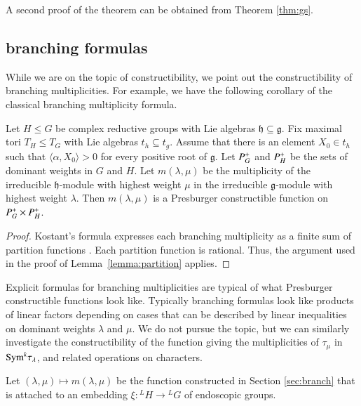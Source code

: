 A second proof of the theorem can be obtained from Theorem \ref{thm:gs}.

\subsection{branching formulas}

While we are on the topic of constructibility, we point out the
constructibility of branching multiplicities.  For example, we have
the following corollary of the classical branching multiplicity formula.


\begin{lemma} 
  Let $H\le G$ be complex reductive groups with Lie algebras
  ${\mathfrak h}\subseteq {\mathfrak g}$.  Fix maximal tori $T_H\le
  T_G$ with Lie algebras $t_h\subseteq t_g$.  Assume that there is an
  element $X_0\in t_h$ such that $\langle\alpha,X_0\rangle>0$ for
  every positive root of ${\mathfrak g}$.  Let $P^+_G$ and $P^+_H$
  be the sets of dominant weights in $G$ and $H$.  Let
  $m(\lambda,\mu)$ be the multiplicity of the irreducible $\mathfrak
  h$-module with highest weight $\mu$ in the irreducible $\mathfrak
  g$-module with highest weight $\lambda$.  Then $m(\lambda,\mu)$ is a
  Presburger constructible function on $P^+_G\times P^+_H$.
\end{lemma}

\begin{proof}  
  Kostant's formula expresses each branching multiplicity as a finite
  sum of partition functions \cite[Theorem ~8.2.1]{goodman}.  Each
  partition function is rational.  Thus, the argument used in the
  proof of Lemma~\ref{lemma:partition} applies.
\end{proof}

\begin{remark}
Explicit formulas for branching multiplicities are typical of what
Presburger constructible functions look like.  Typically branching
formulas look like products of linear factors depending on cases that
can be described by linear inequalities on dominant weights $\lambda$ and
$\mu$.  We do not pursue the topic, but we can similarly investigate
the constructibility of the function giving the multiplicities of
$\tau_\mu$ in ${\operatorname{Sym}}^k \tau_\lambda$, and related operations on
characters.
\end{remark}

Let $(\lambda,\mu)\mapsto m(\lambda,\mu)$ be the function constructed
in Section \ref{sec:branch} that is attached to an embedding
$\xi:{}^LH\to {}^LG$ of endoscopic groups.

